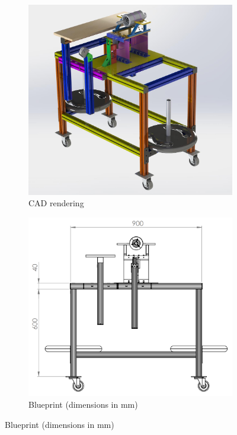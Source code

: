 \begin{figure}[p]
    \centering
    \caption{Test bench}
    \label{fig:test_bench}
    \begin{subfigure}{.49\textwidth}
        \includegraphics[width=.9\textwidth]{fig/test_bench_rendering.jpg}
        \caption{\acs{CAD} rendering}
        \label{fig:test_bench!rendering}
    \end{subfigure}
    \begin{subfigure}{.49\textwidth}
        \includegraphics[width=.9\textwidth]{fig/test_bench_drawing.png}
        \caption{Blueprint (dimensions in mm)}
        \label{fig:test_bench!blueprint}
    \end{subfigure}


\end{figure}
